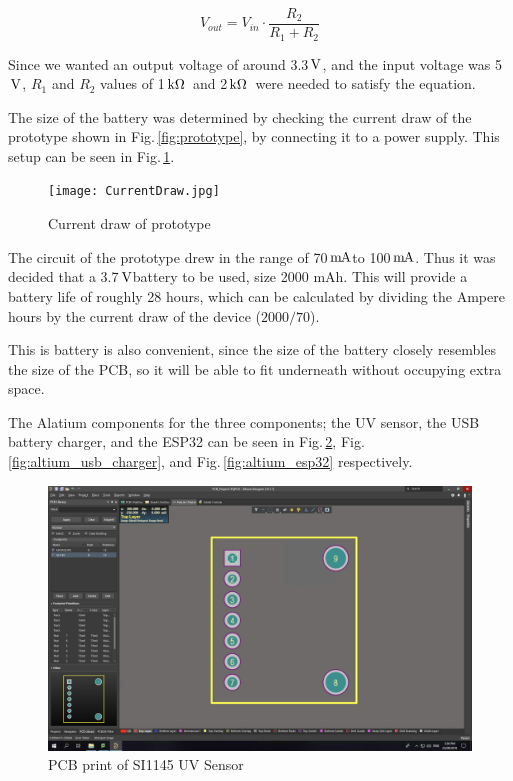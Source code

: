 \documentclass[12pt,openany,a4paper]{book}
\newcommand{\fig}[1]  {Fig.\,\ref{#1}}		%
\newcommand{\pack}	{\hspace{-0.08em}}
\newcommand{\mA}	{\ensuremath{\rm\,m\pack A}}
\newcommand{\V}		{\ensuremath{\rm\,V}}
\newcommand{\kohm}	{\ensuremath{\rm\,k\Omega}}
\begin{document}
\begin{equation}
\label{eq:voltage_drop}
V_{out} = V_{in} \cdot \frac{R_2}{R_1 + R_2}
\end{equation}

Since we wanted an output voltage of around 3.3\V, and the input voltage was 5\V,
$R_1$ and $R_2$ values of 1\kohm\ and 2\kohm\ were needed to satisfy the equation.

The size of the battery was determined by checking the current draw of the
prototype shown in \fig{fig:prototype}, by connecting it to a power supply.
This setup can be seen in \fig{fig:current_draw}.

\begin{figure}[h]
\centering\texttt{[image: CurrentDraw.jpg]}
\caption{Current draw of prototype}
\label{fig:current_draw}
\end{figure}

The circuit of the prototype drew in the range
of 70\mA to 100\mA. Thus it was decided that a 3.7\V battery to be used, size
2000 mAh. This will provide a battery life of roughly 28 hours, which can be
calculated by dividing the Ampere hours by the current draw of the device ($2000/70$).

This is battery is also convenient, since the size of the battery closely
resembles the size of the PCB, so it will be able to fit underneath without
occupying extra space.

The Alatium  components for the three components; the UV sensor, the USB battery
charger, and the ESP32 can be seen in \fig{fig:altium_uv_sensor}, \fig{fig:altium_usb_charger}, and \fig{fig:altium_esp32} respectively.

\begin{figure}[h]
\centering\includegraphics[width=\textwidth]{altium_uv_sensor.png}
\caption{PCB print of SI1145 UV Sensor}
\label{fig:altium_uv_sensor}
\end{figure}
\end{document}

